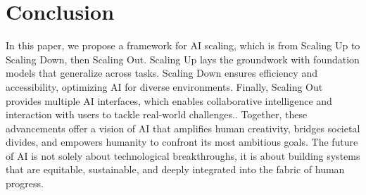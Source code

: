 \section{Conclusion}
In this paper, we propose a framework for AI scaling, which is from Scaling Up to Scaling Down, then Scaling Out.
Scaling Up lays the groundwork with foundation models that generalize across tasks. Scaling Down ensures efficiency and accessibility, optimizing AI for diverse environments. Finally, Scaling Out provides multiple AI interfaces, which enables collaborative intelligence and interaction with users to tackle real-world challenges..
Together, these advancements offer a vision of AI that amplifies human creativity, bridges societal divides, and empowers humanity to confront its most ambitious goals. The future of AI is not solely about technological breakthroughs, it is about building systems that are equitable, sustainable, and deeply integrated into the fabric of human progress.
